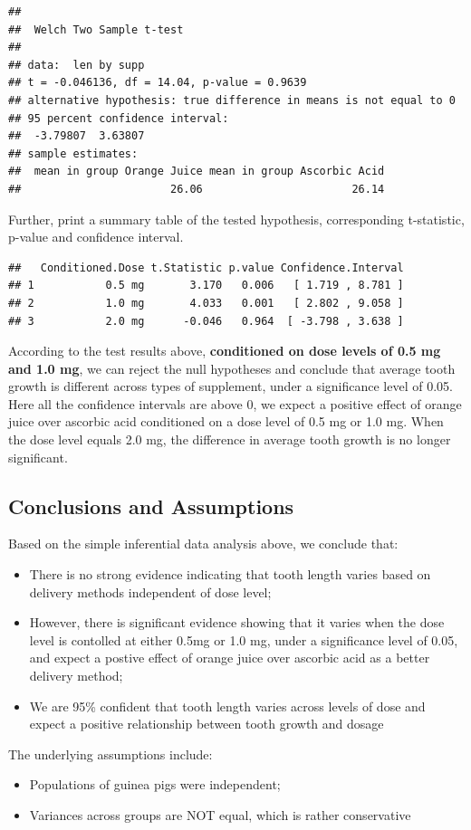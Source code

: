 \documentclass[]{article}
\providecommand{\tightlist}{%
  \setlength{\itemsep}{0pt}\setlength{\parskip}{0pt}}
\begin{document}
\begin{verbatim}
## 
##  Welch Two Sample t-test
## 
## data:  len by supp
## t = -0.046136, df = 14.04, p-value = 0.9639
## alternative hypothesis: true difference in means is not equal to 0
## 95 percent confidence interval:
##  -3.79807  3.63807
## sample estimates:
##  mean in group Orange Juice mean in group Ascorbic Acid 
##                       26.06                       26.14
\end{verbatim}

Further, print a summary table of the tested hypothesis, corresponding
t-statistic, p-value and confidence interval.

\begin{verbatim}
##   Conditioned.Dose t.Statistic p.value Confidence.Interval
## 1           0.5 mg       3.170   0.006   [ 1.719 , 8.781 ]
## 2           1.0 mg       4.033   0.001   [ 2.802 , 9.058 ]
## 3           2.0 mg      -0.046   0.964  [ -3.798 , 3.638 ]
\end{verbatim}

According to the test results above, \textbf{conditioned on dose levels
of 0.5 mg and 1.0 mg}, we can reject the null hypotheses and conclude
that average tooth growth is different across types of supplement, under
a significance level of 0.05. Here all the confidence intervals are
above 0, we expect a positive effect of orange juice over ascorbic acid
conditioned on a dose level of 0.5 mg or 1.0 mg. When the dose level
equals 2.0 mg, the difference in average tooth growth is no longer
significant.

\subsection{Conclusions and
Assumptions}\label{conclusions-and-assumptions}

Based on the simple inferential data analysis above, we conclude that:

\begin{itemize}
\tightlist
\item
  There is no strong evidence indicating that tooth length varies based
  on delivery methods independent of dose level;
\item
  However, there is significant evidence showing that it varies when the
  dose level is contolled at either 0.5mg or 1.0 mg, under a
  significance level of 0.05, and expect a postive effect of orange
  juice over ascorbic acid as a better delivery method;
\item
  We are 95\% confident that tooth length varies across levels of dose
  and expect a positive relationship between tooth growth and dosage
\end{itemize}

The underlying assumptions include:

\begin{itemize}
\tightlist
\item
  Populations of guinea pigs were independent;
\item
  Variances across groups are NOT equal, which is rather conservative
\end{itemize}
\end{document}
